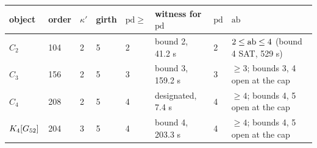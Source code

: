 \begin{tabular}{llllllll}
\toprule
object & order & $\kappa'$ & girth & $\mathrm{pd}\ge$ & witness for $\mathrm{pd}$ & $\mathrm{pd}$ & $\mathrm{ab}$\\
\midrule
$C_2$ & 104 & 2 & 5 & 2 & bound 2, 41.2 s & 2 & $2\le\mathrm{ab}\le4$ (bound 4 SAT, 529 s)\\
$C_3$ & 156 & 2 & 5 & 3 & bound 3, 159.2 s & 3 & $\ge3$; bounds 3, 4 open at the cap\\
$C_4$ & 208 & 2 & 5 & 4 & designated, 7.4 s & 4 & $\ge4$; bounds 4, 5 open at the cap\\
$K_4[G_{52}]$ & 204 & 3 & 5 & 4 & bound 4, 203.3 s & 4 & $\ge4$; bounds 4, 5 open at the cap\\
\bottomrule
\end{tabular}
